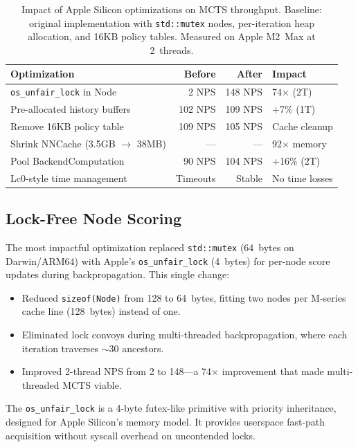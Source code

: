 \documentclass{svproc}
\begin{document}
\begin{table}[!htbp]
\centering
\caption{Impact of Apple Silicon optimizations on MCTS throughput. Baseline: original implementation with \texttt{std::mutex} nodes, per-iteration heap allocation, and 16KB policy tables. Measured on Apple M2~Max at 2~threads.}
\label{tab:optimizations}
\begin{tabular}{lrrl}
\toprule
\textbf{Optimization} & \textbf{Before} & \textbf{After} & \textbf{Impact} \\
\midrule
\texttt{os\_unfair\_lock} in Node & 2 NPS & 148 NPS & 74$\times$ (2T) \\
Pre-allocated history buffers & 102 NPS & 109 NPS & +7\% (1T) \\
Remove 16KB policy table & 109 NPS & 105 NPS & Cache cleanup \\
Shrink NNCache (3.5GB $\to$ 38MB) & --- & --- & 92$\times$ memory \\
Pool BackendComputation & 90 NPS & 104 NPS & +16\% (2T) \\
Lc0-style time management & Timeouts & Stable & No time losses \\
\bottomrule
\end{tabular}
\end{table}

\subsection{Lock-Free Node Scoring}

The most impactful optimization replaced \texttt{std::mutex} (64~bytes on Darwin/ARM64) with Apple's \texttt{os\_unfair\_lock} (4~bytes) for per-node score updates during backpropagation. This single change:

\begin{itemize}
    \item Reduced \texttt{sizeof(Node)} from 128 to 64~bytes, fitting two nodes per M-series cache line (128~bytes) instead of one.
    \item Eliminated lock convoys during multi-threaded backpropagation, where each iteration traverses $\sim$30 ancestors.
    \item Improved 2-thread NPS from 2 to 148---a 74$\times$ improvement that made multi-threaded MCTS viable.
\end{itemize}

The \texttt{os\_unfair\_lock} is a 4-byte futex-like primitive with priority inheritance, designed for Apple Silicon's memory model. It provides userspace fast-path acquisition without syscall overhead on uncontended locks.
\end{document}
